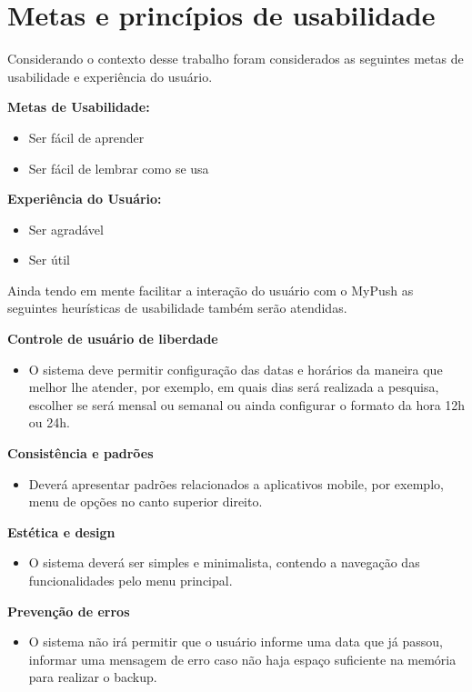 \chapter[Metas e princípios de usabilidade]{Metas e princípios de usabilidade}

	Considerando o contexto desse trabalho foram considerados as seguintes metas 
de usabilidade e experiência do usuário.

\textbf{Metas de Usabilidade:}
\begin{itemize}
	\item Ser fácil de aprender
	\item Ser fácil de lembrar como se usa
\end{itemize}	

\textbf{Experiência do Usuário:}
\begin{itemize}
	\item Ser agradável
	\item Ser útil
\end{itemize}


	Ainda tendo em mente facilitar a interação do usuário com o MyPush as seguintes
heurísticas de usabilidade também serão atendidas.

\textbf{Controle de usuário de liberdade}
\begin{itemize}
	\item O sistema deve permitir configuração das datas e horários da maneira que melhor lhe atender, por exemplo, em quais dias será realizada a pesquisa, escolher se será mensal ou semanal ou ainda configurar o formato da hora 12h ou 24h.
\end{itemize}

\textbf{Consistência e padrões}
\begin{itemize}
	\item Deverá apresentar padrões relacionados a aplicativos mobile, por exemplo, menu de opções no canto superior direito.
\end{itemize}

\textbf{Estética e design}
\begin{itemize}
	\item O sistema deverá ser simples e minimalista, contendo a navegação das funcionalidades pelo menu principal.
\end{itemize}

\textbf{Prevenção de erros}
\begin{itemize}
	\item O sistema não irá permitir que o usuário informe uma data que já passou, informar uma mensagem de erro caso não haja espaço suficiente na memória para realizar o backup.
\end{itemize}